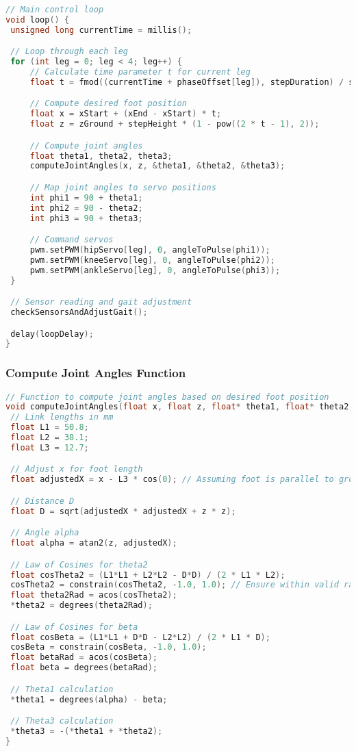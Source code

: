\documentclass{article}
\begin{document}
\begin{lstlisting}[language=C++, caption=Main Control Loop]
// Main control loop
void loop() {
 unsigned long currentTime = millis();

 // Loop through each leg
 for (int leg = 0; leg < 4; leg++) {
     // Calculate time parameter t for current leg
     float t = fmod((currentTime + phaseOffset[leg]), stepDuration) / stepDuration;

     // Compute desired foot position
     float x = xStart + (xEnd - xStart) * t;
     float z = zGround + stepHeight * (1 - pow((2 * t - 1), 2));

     // Compute joint angles
     float theta1, theta2, theta3;
     computeJointAngles(x, z, &theta1, &theta2, &theta3);

     // Map joint angles to servo positions
     int phi1 = 90 + theta1;
     int phi2 = 90 - theta2;
     int phi3 = 90 + theta3;

     // Command servos
     pwm.setPWM(hipServo[leg], 0, angleToPulse(phi1));
     pwm.setPWM(kneeServo[leg], 0, angleToPulse(phi2));
     pwm.setPWM(ankleServo[leg], 0, angleToPulse(phi3));
 }

 // Sensor reading and gait adjustment
 checkSensorsAndAdjustGait();

 delay(loopDelay);
}
\end{lstlisting}

\subsubsection{Compute Joint Angles Function}

\begin{lstlisting}[language=C++, caption=Compute Joint Angles Function]
// Function to compute joint angles based on desired foot position
void computeJointAngles(float x, float z, float* theta1, float* theta2, float* theta3) {
 // Link lengths in mm
 float L1 = 50.8;
 float L2 = 38.1;
 float L3 = 12.7;

 // Adjust x for foot length
 float adjustedX = x - L3 * cos(0); // Assuming foot is parallel to ground

 // Distance D
 float D = sqrt(adjustedX * adjustedX + z * z);

 // Angle alpha
 float alpha = atan2(z, adjustedX);

 // Law of Cosines for theta2
 float cosTheta2 = (L1*L1 + L2*L2 - D*D) / (2 * L1 * L2);
 cosTheta2 = constrain(cosTheta2, -1.0, 1.0); // Ensure within valid range
 float theta2Rad = acos(cosTheta2);
 *theta2 = degrees(theta2Rad);

 // Law of Cosines for beta
 float cosBeta = (L1*L1 + D*D - L2*L2) / (2 * L1 * D);
 cosBeta = constrain(cosBeta, -1.0, 1.0);
 float betaRad = acos(cosBeta);
 float beta = degrees(betaRad);

 // Theta1 calculation
 *theta1 = degrees(alpha) - beta;

 // Theta3 calculation
 *theta3 = -(*theta1 + *theta2);
}
\end{lstlisting}
\end{document}
